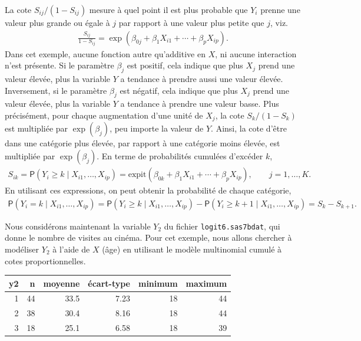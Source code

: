 \documentclass[
  11pt,
  letterpaper,
]{book}
\theoremstyle{definition}
\theoremstyle{definition}
\theoremstyle{definition}
\theoremstyle{definition}
\theoremstyle{remark}
\begin{document}
La cote \(S_{ij}/(1-S_{ij})\) mesure à quel point il est plus probable que \(Y_i\) prenne une valeur plus grande ou égale à \(j\) par rapport à une valeur plus petite que \(j\), viz.
\begin{align*}
\frac{S_{ij}}{1-S_{ij}} = \exp( \beta_{0j} + \beta_1X_{i1} + \cdots + \beta_p X_{ip}).
\end{align*}
Dans cet exemple, aucune fonction autre qu'additive en \(X\), ni aucune interaction n'est présente. Si le paramètre \(\beta_j\) est positif, cela indique que plus \(X_j\) prend une valeur élevée, plus la variable \(Y\) a tendance à prendre aussi une valeur élevée. Inversement, si le paramètre \(\beta_j\) est négatif, cela indique que plus \(X_j\) prend une valeur élevée, plus la variable \(Y\) a tendance à prendre une valeur basse. Plus précisément, pour chaque augmentation d'une unité de \(X_j\), la cote \(S_k/(1-S_k)\) est multipliée par \(\exp(\beta_j)\), peu importe la valeur de \(Y\). Ainsi, la cote d'être dans une catégorie plus élevée, par rapport à une catégorie moins élevée, est multipliée par \(\exp(\beta_j)\). En terme de probabilités cumulées d'excéder \(k\),
\begin{align*}
S_{ik} = {\mathsf P}\left(Y_i \geq k \mid X_{i1}, \ldots, X_{ip}\right) = \mathrm{expit}(\beta_{0k} + \beta_1 X_{i1} + \cdots + \beta_p X_{ip}), \qquad j =1, \ldots, K.
\end{align*}
En utilisant ces expressions, on peut obtenir la probabilité de chaque catégorie,
\begin{align*}
{\mathsf P}\left(Y_i = k \mid X_{i1}, \ldots, X_{ip}\right) ={\mathsf P}\left(Y_i \geq k \mid X_{i1}, \ldots, X_{ip}\right) -{\mathsf P}\left(Y_i \geq k+1 \mid X_{i1}, \ldots, X_{ip}\right) = S_{k} - S_{k+1}.
\end{align*}

Nous considérons maintenant la variable \(Y_2\) du fichier \texttt{logit6.sas7bdat}, qui donne le nombre de visites au cinéma. Pour cet exemple, nous allons chercher à modéliser \(Y_2\) à l'aide de \(X\) (âge) en utilisant le modèle multinomial cumulé à cotes proportionnelles.

\begin{tabular}{rrrrrr}
\toprule
y2 & n & moyenne & écart-type & minimum & maximum\\
\midrule
1 & 44 & 33.5 & 7.23 & 18 & 44\\
2 & 38 & 30.4 & 8.16 & 18 & 44\\
3 & 18 & 25.1 & 6.58 & 18 & 39\\
\bottomrule
\end{tabular}
\end{document}
